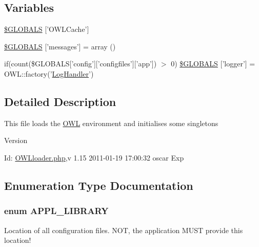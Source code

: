 \subsection*{Variables}
\begin{DoxyCompactItemize}
\item 
\hyperlink{OWLloader_8php_a79190ec221c2b52403f7324f1d224c8f}{\$GLOBALS} \mbox{[}'OWLCache'\mbox{]}
\item 
\hyperlink{OWLloader_8php_a65f2996116eed36e9ab25f254a470259}{\$GLOBALS} \mbox{[}'messages'\mbox{]} = array ()
\item 
if(count(\$GLOBALS\mbox{[}'config'\mbox{]}\mbox{[}'configfiles'\mbox{]}\mbox{[}'app'\mbox{]}) $>$ 0) \hyperlink{OWLloader_8php_a5657c6427a5b1e3d4450f366cddef80a}{\$GLOBALS} \mbox{[}'logger'\mbox{]} = OWL::factory('\hyperlink{classLogHandler}{LogHandler}')
\end{DoxyCompactItemize}


\subsection{Detailed Description}
This file loads the \hyperlink{classOWL}{OWL} environment and initialises some singletons \begin{DoxyVersion}{Version}

\end{DoxyVersion}
\begin{DoxyParagraph}{Id:}
\hyperlink{OWLloader_8php}{OWLloader.php},v 1.15 2011-\/01-\/19 17:00:32 oscar Exp 
\end{DoxyParagraph}


\subsection{Enumeration Type Documentation}
\subsubsection[{APPL\_\-LIBRARY}]{\setlength{\rightskip}{0pt plus 5cm}enum {\bf APPL\_\-LIBRARY}}\label{OWLloader_8php_a1b19bb6ffba1d1e7871092e086cc4e94}


Location of all configuration files. NOT, the application MUST provide this location! 

